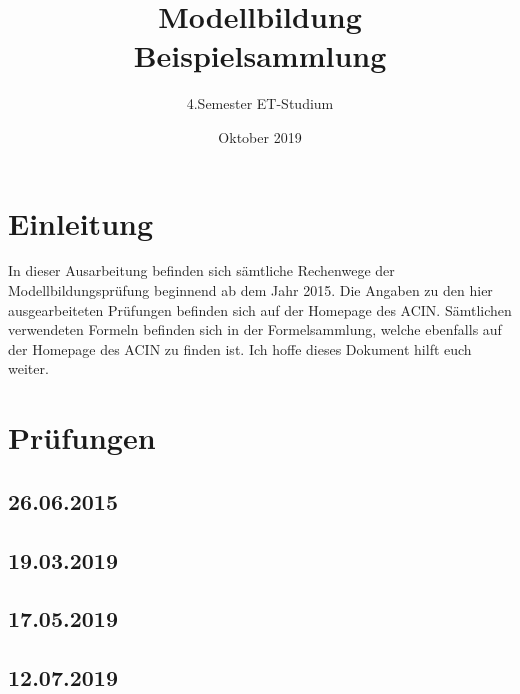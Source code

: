 \documentclass[a4paper,12p]{article}
\title{\huge Modellbildung\\\large \huge Beispielsammlung}
\author{\huge 4.Semester ET-Studium}
\date{\huge Oktober 2019}
\begin{document}
	
	\maketitle
	\newpage
	\tableofcontents
	\newpage
	
	\section{Einleitung}
	In dieser Ausarbeitung befinden sich sämtliche Rechenwege der Modellbildungsprüfung beginnend ab dem Jahr 2015. Die Angaben zu den hier ausgearbeiteten Prüfungen befinden sich auf der Homepage des ACIN. Sämtlichen verwendeten Formeln befinden sich in der Formelsammlung, welche ebenfalls auf der Homepage des ACIN zu finden ist. Ich hoffe dieses Dokument hilft euch weiter. 
	
	\section{Prüfungen}
	
	\subsection{26.06.2015}
	
	\newpage
	\subsection{19.03.2019}
		
	
%	
%	
	\newpage	
	\subsection{17.05.2019}
	
	
	
	\newpage
	\subsection{12.07.2019}
	
	
	
\end{document}
